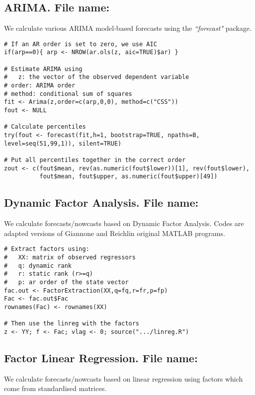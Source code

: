 \documentclass[12pt]{article}
\begin{document}
\subsection{ARIMA. File name: \color{blue}{ar.R}}

We calculate various ARIMA model-based forecasts using the \emph{``forecast"}
package.

\begin{lstlisting}[title=\textbf{ARIMA Forecasting.}]
# If an AR order is set to zero, we use AIC
if(arp==0){ arp <- NROW(ar.ols(z, aic=TRUE)$ar) }

# Estimate ARIMA using
#	z: the vector of the observed dependent variable
# order: ARIMA order
# method: conditional sum of squares
fit <- Arima(z,order=c(arp,0,0), method=c("CSS"))
fout <- NULL

# Calculate percentiles
try(fout <- forecast(fit,h=1, bootstrap=TRUE, npaths=B, level=seq(51,99,1)), silent=TRUE)

# Put all percentiles together in the correct order
zout <- c(fout$mean, rev(as.numeric(fout$lower))[1], rev(fout$lower),
          fout$mean, fout$upper, as.numeric(fout$upper)[49])
\end{lstlisting}

\subsection{Dynamic Factor Analysis. File name: \color{blue}{dfa.R}}

We calculate forecasts/nowcasts based on Dynamic Factor Analysis. Codes are
adapted versions of Giannone and Reichlin original MATLAB programs.

\begin{lstlisting}[title=\textbf{Dynamic Factor Analysis Forecasting.}]
# Extract factors using:
#	XX: matrix of observed regressors
#	q: dynamic rank
#   r: static rank (r>=q)
#   p: ar order of the state vector
fac.out <- FactorExtraction(XX,q=fq,r=fr,p=fp)
Fac <- fac.out$Fac
rownames(Fac) <- rownames(XX)

# Then use the linreg with the factors
z <- YY; f <- Fac; vlag <- 0; source(".../linreg.R")
\end{lstlisting}

\subsection{Factor Linear Regression. File name: \color{blue}{Flinreg.R}}

We calculate forecasts/nowcasts based on linear regression using factors which
come from standardised matrices.
\end{document}
